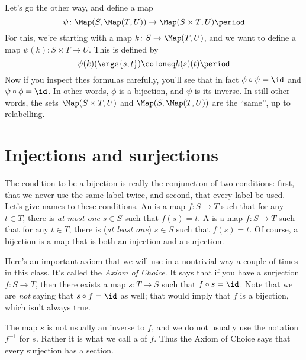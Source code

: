 Let's go the other way, and define a map
\[
	\psi \colon \Map(S, \Map(T, U)) \to \Map(S \times T, U) \period
\]
For this, we're starting with a map $ k \colon S \to \Map(T, U)$, and
we want to define a map $\psi(k) \colon S \times T \to U$.
This is defined by
\[
	\psi(k)(\angs{s,t}) \coloneq k(s)(t) \period
\]
Now if you inspect thes formulas carefully, you'll see that in fact $\phi \circ \psi = \id $ and $\psi \circ \phi = \id$.
In other words, $\phi $ is a bijection, and $\psi$ is its inverse.
In still other words, the sets $\Map(S \times T, U)$ and $\Map(S, \Map(T, U))$ are the \enquote{same}, up to relabelling.

\section{Injections and surjections}%
\label{sec:injections_and_surjections}

The condition to be a bijection is really the conjunction of two conditions:
first, that we never use the same label twice, and
second, that every label be used.
Let's give names to these conditions.
An  is a map $f\colon S \to T$ such that for any $t\in T$, there is \emph{at most one}%
$s\in S$ such that $f(s)=t$.
A  is a map $f\colon S \to T$ such that for any $t\in T$, there is (\emph{at least one}) $s\in S$ such that $f(s)=t$.
Of course, a bijection is a map that is both an injection and a surjection.

Here's an important axiom that we will use in a nontrivial way a couple of times in this class.
It's called the \emph{Axiom of Choice}.
It says that if you have a surjection $ f \colon S \to T$, then there exists a map $ s \colon T \to S $ such that $f \circ s = \id$.
Note that we are \emph{not} saying that $s \circ f = \id$ as well;
that would imply that $f$ is a bijection, which isn't always true.

The map $s$ is not usually an inverse to $f$, and we do not usually use the notation $f^{-1}$ for $s$.
Rather it is what we call a  of $f$.
Thus the Axiom of Choice says that every surjection has a section.

